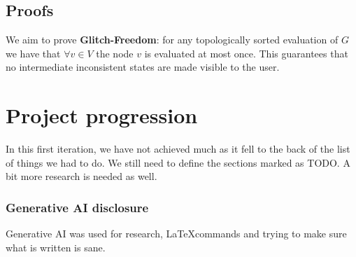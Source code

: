 \documentclass{article}
\begin{document}
\subsection{Proofs}
We aim to prove \textbf{Glitch-Freedom}: for any topologically sorted evaluation of $ G $ we have that $ \forall v \in V $ the node $ v $ is evaluated at most once. This guarantees that no intermediate inconsistent states are made visible to the user.

\section{Project progression}

In this first iteration, we have not achieved much as it fell to the back of the list of things we had to do. We still need to define the sections marked as TODO. A bit more research is needed as well.

\subsubsection*{Generative AI disclosure}

Generative AI was used for research, \LaTeX \space commands and trying to make sure what is written is sane.
\printbibliography
\end{document}
